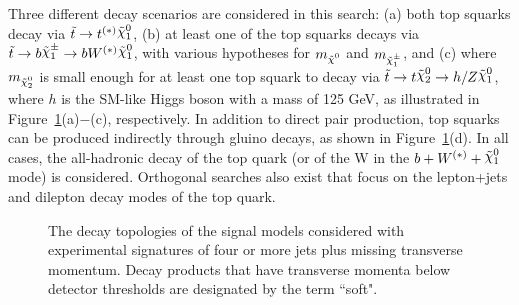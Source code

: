 %
%

Three different decay scenarios are considered in this search: (a) both top squarks decay via $\stop\rightarrow t^{(*)} \ninoone$, (b) at least one of the top squarks decays via $\stop\rightarrow b \chinoonepm \rightarrow b W^{(*)}\ninoone$, with various hypotheses for $\mLSP$ and $m_{\chinoonepm}$, and (c) where $m_{\ninotwo}$ is small enough for at least one top squark to decay via $\stop\to t \ninotwo \to h/Z \ninoone$, where $h$ is the SM-like Higgs boson with a mass of 125 GeV, as illustrated in Figure~\ref{fig:feynDiagModels}(a)$-$(c), respectively. In addition to direct pair production, top squarks can be produced indirectly through gluino decays, as shown in Figure~\ref{fig:feynDiagModels}(d).  In all cases, the all-hadronic decay of the top quark (or of the W in the $b + W^{(\ast)}
+ \ninoone$ mode) is considered. Orthogonal searches also exist that
focus on the lepton+jets\cite{stop1L13tev} and dilepton\cite{stop2L13tev} decay modes of the top quark. \\


\begin{figure}[htb]
\begin{center}
\hspace{0.05\textwidth}
\hspace{0.05\textwidth}
\hspace{0.05\textwidth}
\hspace{0.05\textwidth}
\end{center}
\caption[Top quark decay topologies.]{The decay topologies of the signal models considered with experimental signatures of four or more jets plus missing transverse momentum. Decay products that have transverse momenta below detector thresholds are designated by the term ``soft".}
\label{fig:feynDiagModels}
\end{figure}

